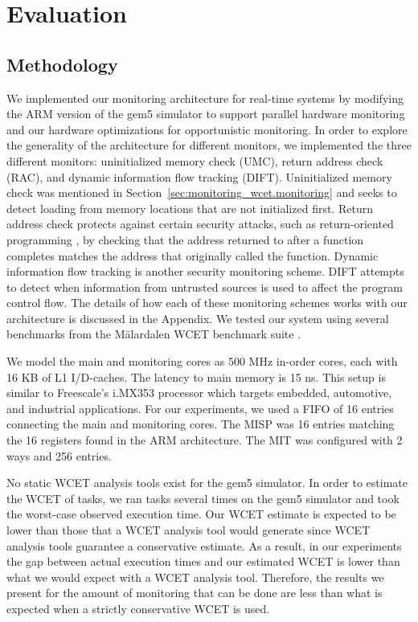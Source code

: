 \section{Evaluation}
\label{sec:monitoring_hard_drop.evaluation}

\subsection{Methodology} 
\label{sec:monitoring_hard_drop.evaluation.methodology}

We implemented our monitoring architecture for real-time systems by modifying
the ARM version of the gem5 simulator \cite{gem5} to support parallel hardware
monitoring and our hardware optimizations for opportunistic monitoring. In
order to explore the generality of the architecture for different monitors, we
implemented the three different monitors: uninitialized memory check (UMC),
return address check (RAC), and dynamic information flow tracking (DIFT).
Uninitialized memory check was mentioned in
Section~\ref{sec:monitoring_wcet.monitoring} and seeks to detect loading from
memory locations that are not initialized first. Return address check protects
against certain security attacks, such as return-oriented programming
\cite{rop-ccs07}, by checking that the address returned to after a
function completes matches the address that originally called the function.
Dynamic information flow tracking is another security monitoring scheme. DIFT
attempts to detect when information from untrusted sources is used to affect
the program control flow. The details of how each of these monitoring schemes
works with our architecture is discussed in the Appendix. We tested our system
using several benchmarks from the M{\"a}lardalen WCET benchmark suite
\cite{malardalen}. 

We model the main and monitoring cores as 500 MHz in-order cores, each with 16
KB of L1 I/D-caches. The latency to main memory is 15 ns. This setup is
similar to Freescale's i.MX353 processor which targets embedded, automotive,
and industrial applications. For our experiments, we used a FIFO of 16 entries
connecting the main and monitoring cores. The MISP was 16 entries matching the
16 registers found in the ARM architecture. The MIT was configured with 2 ways
and 256 entries. 

No static WCET analysis tools exist for the gem5 simulator. In order to
estimate the WCET of tasks, we ran tasks several times on the gem5 simulator
and took the worst-case observed execution time. Our WCET estimate is expected
to be lower than those that a WCET analysis tool would generate since WCET
analysis tools guarantee a conservative estimate. As a result, in our
experiments the gap between actual execution times and our estimated WCET is
lower than what we would expect with a WCET analysis tool. Therefore, the
results we present for the amount of monitoring that can be done are less than
what is expected when a strictly conservative WCET is used.

